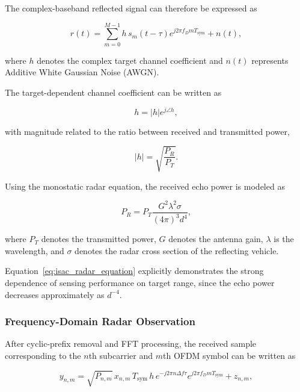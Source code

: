 The complex-baseband reflected signal can therefore be expressed as

\begin{equation}
r(t)
=
\sum_{m=0}^{M-1}
h\,
s_m(t-\tau)
e^{j2\pi f_D mT_{\mathrm{sym}}}
+
n(t),
\label{eq:isac_echo_signal}
\end{equation}

where $h$ denotes the complex target channel coefficient and $n(t)$
represents Additive White Gaussian Noise (AWGN).

The target-dependent channel coefficient can be written as

\begin{equation}
h
=
|h|e^{j\angle h},
\label{eq:isac_channel_coeff}
\end{equation}

with magnitude related to the ratio between received and transmitted power,

\begin{equation}
|h|
=
\sqrt{\frac{P_R}{P_T}}.
\label{eq:isac_channel_gain}
\end{equation}

Using the monostatic radar equation, the received echo power is modeled as

\begin{equation}
P_R
=
P_T
\frac{
G^2
\lambda^2
\sigma
}{
(4\pi)^3d^4
},
\label{eq:isac_radar_equation}
\end{equation}

where $P_T$ denotes the transmitted power, $G$ denotes the antenna gain,
$\lambda$ is the wavelength, and $\sigma$ denotes the radar cross section
of the reflecting vehicle.

Equation~\eqref{eq:isac_radar_equation} explicitly demonstrates the
strong dependence of sensing performance on target range, since the echo
power decreases approximately as $d^{-4}$.

\subsubsection{Frequency-Domain Radar Observation}

After cyclic-prefix removal and FFT processing, the received sample
corresponding to the $n$th subcarrier and $m$th OFDM symbol can be written as

\begin{equation}
y_{n,m}
=
\sqrt{P_{n,m}}\,
x_{n,m}\,
T_{\mathrm{sym}}\,
h\,
e^{-j2\pi n\Delta f\tau}
e^{j2\pi f_DmT_{\mathrm{sym}}}
+
z_{n,m},
\label{eq:isac_fft_observation}
\end{equation}

